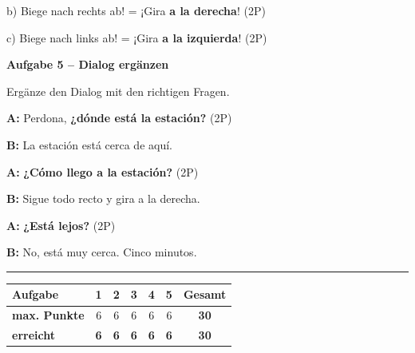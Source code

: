 \documentclass[11pt, a4paper]{article}
\newcommand{\fachfarbe}{spanisch}
\newcommand{\punktebox}[1]{\hfill\fbox{\small \_\_\_/#1}}
\newcommand{\lsg}[1]{\textcolor{loesung}{\textbf{#1}}}
\newenvironment{aufgabe}[1]{%
    \needspace{5\baselineskip}%
    \nopagebreak[4]%
    \vspace{10pt}
    \noindent\textbf{\textcolor{\fachfarbe}{Aufgabe #1}}
    \nopagebreak[4]%
    \vspace{5pt}
    \nopagebreak[4]%
    \begin{list}{}{\leftmargin=0pt}
    \item[]
}{%
    \end{list}
}
\begin{document}
\noindent
b) Biege nach rechts ab! = ¡Gira \lsg{a la derecha}! \hfill (2P)

\vspace{0.8em}

\noindent
c) Biege nach links ab! = ¡Gira \lsg{a la izquierda}! \hfill (2P)

\vspace{15pt}


\begin{aufgabe}{5 -- Dialog ergänzen}
Ergänze den Dialog mit den richtigen Fragen. \punktebox{6}
\end{aufgabe}

\begin{tcolorbox}[colback=hellgrau, colframe=grau, boxrule=0.5pt, arc=0pt]
\noindent
\textbf{A:} Perdona, \lsg{¿dónde está la estación?} \hfill (2P)

\vspace{0.5em}

\noindent
\textbf{B:} La estación está cerca de aquí.

\vspace{0.8em}

\noindent
\textbf{A:} \lsg{¿Cómo llego a la estación?} \hfill (2P)

\vspace{0.5em}

\noindent
\textbf{B:} Sigue todo recto y gira a la derecha.

\vspace{0.8em}

\noindent
\textbf{A:} \lsg{¿Está lejos?} \hfill (2P)

\vspace{0.5em}

\noindent
\textbf{B:} No, está muy cerca. Cinco minutos.
\end{tcolorbox}


\vspace{25pt}
\hrule
\vspace{10pt}

\noindent
\begin{tabularx}{\textwidth}{|X|c|c|c|c|c||c|}
\hline
\textbf{Aufgabe} & 1 & 2 & 3 & 4 & 5 & \textbf{Gesamt} \\
\hline
\textbf{max. Punkte} & 6 & 6 & 6 & 6 & 6 & \textbf{30} \\
\hline
\textbf{erreicht} & \lsg{6} & \lsg{6} & \lsg{6} & \lsg{6} & \lsg{6} & \lsg{30} \\
\hline
\end{tabularx}
\end{document}
